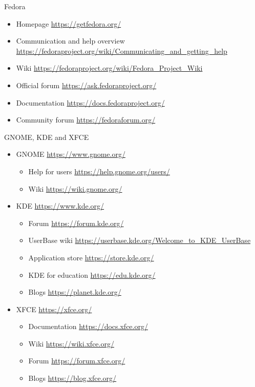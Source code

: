 \documentclass[compress, ucs, xelatex, 11pt, xcolor=svgnames,
  hyperref={
    bookmarks=true,
    unicode=true,
    colorlinks=true,
    pdftitle={Linux, command line and MetaCentrum},
    plainpages=false,
    pdfauthor={Vojtech Zeisek},
    pdfsubject={Course about use of Linux command line, writing shell scripts and using MetaCentrum of CESNET},
    pdfcreator={XeLaTeX},
    pdfkeywords={Linux, GNU, BASH, shell, command line, MetaCentrum},
    linkcolor=DarkRed,
    anchorcolor=DarkBlue,
    citecolor=Indigo,
    filecolor=NavyBlue,
    menucolor=DarkMagenta,
    urlcolor=DarkBlue,
    pdftex},
  url={hyphens, lowtilde} %
  ]{beamer}
\begin{document}
\begin{frame}{Fedora}
  \begin{itemize}
    \item Homepage \url{https://getfedora.org/}
    \item Communication and help overview \url{https://fedoraproject.org/wiki/Communicating_and_getting_help}
    \item Wiki \url{https://fedoraproject.org/wiki/Fedora_Project_Wiki}
    \item Official forum \url{https://ask.fedoraproject.org/}
    \item Documentation \url{https://docs.fedoraproject.org/}
    \item Community forum \url{https://fedoraforum.org/}
  \end{itemize}
\end{frame}

\begin{frame}{GNOME, KDE and XFCE}
  \begin{itemize}
    \item GNOME \url{https://www.gnome.org/}
    \begin{itemize}
      \item Help for users \url{https://help.gnome.org/users/}
      \item Wiki \url{https://wiki.gnome.org/}
    \end{itemize}
    \item KDE \url{https://www.kde.org/}
    \begin{itemize}
      \item Forum \url{https://forum.kde.org/}
      \item UserBase wiki \url{https://userbase.kde.org/Welcome_to_KDE_UserBase}
      \item Application store \url{https://store.kde.org/}
      \item KDE for education \url{https://edu.kde.org/}
      \item Blogs \url{https://planet.kde.org/}
    \end{itemize}
    \item XFCE \url{https://xfce.org/}
    \begin{itemize}
      \item Documentation \url{https://docs.xfce.org/}
      \item Wiki \url{https://wiki.xfce.org/}
      \item Forum \url{https://forum.xfce.org/}
      \item Blogs \url{https://blog.xfce.org/}
    \end{itemize}
  \end{itemize}
\end{frame}
\end{document}
